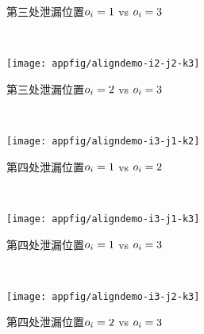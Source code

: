 {\begin{appfig}[!htb]
\begin{subfigure}[b]{\trif\textwidth}
			\caption{第三处泄漏位置$o_i=1$ vs $o_i=3$}
			\label{fig:aligndemo213}
		\end{subfigure}
		~%
		\begin{subfigure}[b]{\trif\textwidth}
			\texttt{[image: appfig/aligndemo-i2-j2-k3]}
			\caption{第三处泄漏位置$o_i=2$ vs $o_i=3$}
			\label{fig:aligndemo223}
		\end{subfigure}
		\\%
		\begin{subfigure}[b]{\trif\textwidth}
			\texttt{[image: appfig/aligndemo-i3-j1-k2]}
			\caption{第四处泄漏位置$o_i=1$ vs $o_i=2$}
			\label{fig:aligndemo312}
		\end{subfigure}%
		~%
		\begin{subfigure}[b]{\trif\textwidth}
			\texttt{[image: appfig/aligndemo-i3-j1-k3]}
			\caption{第四处泄漏位置$o_i=1$ vs $o_i=3$}
			\label{fig:aligndemo313}
		\end{subfigure}
		~%
		\begin{subfigure}[b]{\trif\textwidth}
			\texttt{[image: appfig/aligndemo-i3-j2-k3]}
			\caption{第四处泄漏位置$o_i=2$ vs $o_i=3$}
			\label{fig:aligndemo323}
		\end{subfigure}
		\\%
		\label{appfig:aligndemoall}
	\end{appfig}
	
}
